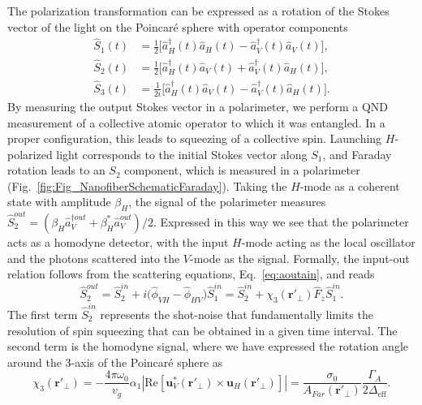 \documentclass[preprint,aps,pra,onecolumn,superscriptaddress]{revtex4-1} %
\newcommand{\mbf}[1]{\mathbf{#1}}
\newcommand{\smallfrac}[2]{\mbox{$\frac{#1}{#2}$}}
\newcommand{\eff}{\text{eff}}
\newcommand{\Poincare}{Poincar\'e\xspace}
\begin{document}
The polarization transformation can be expressed as a rotation of the Stokes vector of the light on the \Poincare sphere with operator components
\begin{subequations}\label{Eq::StokesComponents}
	\begin{align}
		\hat{S}_1(t) & = \smallfrac{1}{2}\big[ \hat{a}^\dag_H(t) \hat{a}_H(t)-\hat{a}^\dag_V(t) \hat{a}_V(t) \big], \\
	 	\hat{S}_2(t) & = \smallfrac{1}{2}\big[ \hat{a}^\dag_H(t) \hat{a}_V(t)+\hat{a}^\dag_V(t) \hat{a}_H(t) \big], \\ 
		\hat{S}_3(t) & = \smallfrac{1}{2i}\big[ \hat{a}^\dag_H(t) \hat{a}_V(t) -\hat{a}^\dag_V(t) \hat{a}_H(t) \big].
	\end{align}
\end{subequations}
By measuring the output Stokes vector in a polarimeter, we perform a QND measurement of a collective atomic operator to which it was entangled.  In a proper configuration, this leads to squeezing of a collective spin.  Launching $H$-polarized light corresponds to the initial Stokes vector along $S_1$, and Faraday rotation leads to an $S_2$ component, which is measured in a polarimeter (Fig.~\ref{fig:Fig_NanofiberSchematicFaraday}).  Taking the $H$-mode as a coherent state with amplitude $\beta_H$, the signal of the polarimeter measures $\hat{S}_2^{out} = (\beta_H \hat{a}_V^{\dag out} +\beta^*_H \hat{a}_V^{out})/2$.  Expressed in this way we see that the polarimeter acts as a homodyne detector, with the input $H$-mode acting as the local oscillator and the photons scattered into the $V$-mode as the signal.  Formally, the input-out relation follows from the scattering equations, Eq.~\eqref{eq:aoutain}, and reads
\begin{equation}
\hat{S}^{out}_2 = \hat{S}^{in}_2 +i \big( \hat{\phi}_{VH}- \hat{\phi}_{HV} \big) \hat{S}^{in}_1 =  \hat{S}^{in}_2 + \chi_3(\mbf{r}'_\perp) \hat{F}_z \hat{S}^{in}_1.
\end{equation}
The first term $\hat{S}^{in}_2$ represents the shot-noise that fundamentally limits the resolution of spin squeezing that can be obtained in a given time interval.  The second term is the homodyne signal, where we have expressed the rotation angle around the 3-axis of the \Poincare sphere as
\begin{equation}
\chi_3(\mbf{r}'_\perp) = -\frac{4 \pi \omega_0}{v_g} \alpha_1 \left\vert \text{Re} \left[ \mbf{u}^*_V (\mbf{r}'_\perp) \times \mbf{u}_H (\mbf{r}'_\perp) \right] \right\vert = \frac{\sigma_0}{A_{Far}(\mbf{r}'_\perp)} \frac{\Gamma_A}{2 \Delta_{\eff}}.
\end{equation}
\end{document}
